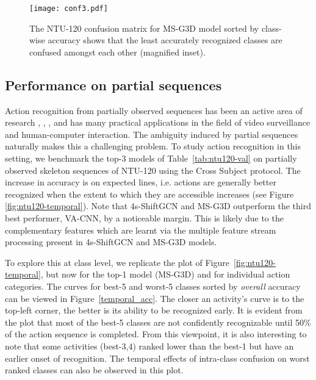 \documentclass[twocolumn]{svjour3}          \smartqed  \usepackage{graphicx}
\begin{document}
\begin{figure*}[htbp]
\centering
    \texttt{[image: conf3.pdf]}
\caption{The NTU-120 confusion matrix for MS-G3D model sorted by class-wise accuracy shows that the least accurately recognized classes are confused amongst each other (magnified inset).}
\label{fig:ntu-120_confusion}
\end{figure*}

\subsection{Performance on partial sequences}
\label{sec:ntu120-temporal}

Action recognition from partially observed sequences has been an active area of research \cite{temporal1}, \cite{temporal2}, \cite{temporal3}, \cite{temporal4} and has many practical applications in the field of video surveillance and human-computer interaction. The ambiguity induced by partial sequences naturally makes this a challenging problem. To study action recognition in this setting, we benchmark the top-3 models of Table~\ref{tab:ntu120-val} on partially observed skeleton sequences of NTU-120 using the Cross Subject protocol.   The increase in accuracy is on expected lines, i.e. actions are generally better recognized when the extent to which they are accessible increases (see Figure \ref{fig:ntu120-temporal}). Note that 4s-ShiftGCN and MS-G3D outperform the third best performer, VA-CNN, by a noticeable margin. This is likely due to the complementary features which are learnt via the multiple feature stream processing present in 4s-ShiftGCN and MS-G3D models.

To explore this at class level, we replicate the plot of Figure~\ref{fig:ntu120-temporal}, but now for the top-1 model (MS-G3D) and for individual action categories. The curves for best-5 and worst-5 classes sorted by \textit{overall} accuracy can be viewed in Figure~\ref{temporal_acc}. The closer an activity's curve is to the top-left corner, the better is its ability to be recognized early. It is evident from the plot that most of the best-5 classes are not confidently recognizable until 50\% of the action sequence is completed. From this viewpoint, it is also interesting to note that some activities (best-3,4) ranked lower than the best-1 but have an earlier onset of recognition. The temporal effects of intra-class confusion on worst ranked classes can also be observed in this plot.
\end{document}
